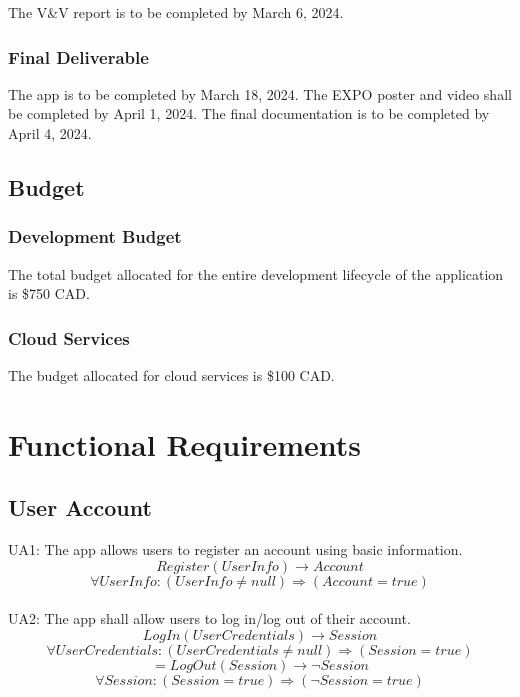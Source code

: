 \documentclass[12pt]{article}
\begin{document}
The V\&V report is to be completed by March 6, 2024.

\subsubsection{Final Deliverable}

The app is to be completed by March 18, 2024. The EXPO poster and video shall be completed by April 1, 2024. The final documentation is to be completed by April 4, 2024. 

\subsection{Budget}

\subsubsection{Development Budget}

The total budget allocated for the entire development lifecycle of the application is \$750 CAD.

\subsubsection{Cloud Services}

The budget allocated for cloud services is \$100 CAD.

\section{Functional Requirements}

\subsection{User Account}

\parindent UA1: The app allows users to register an account using basic information.
\[Register(UserInfo) \rightarrow Account \]
\[ \forall UserInfo: (UserInfo \neq null) \Rightarrow (Account = true) \]\\

UA2: The app shall allow users to log in/log out of their account.
\[LogIn(UserCredentials) \rightarrow Session \]
\[ \forall UserCredentials: (UserCredentials \neq null) \Rightarrow (Session = true) \]
\[=LogOut(Session) \rightarrow \neg Session \]
\[ \forall Session: (Session = true) \Rightarrow (\neg Session = true) \]\\
\end{document}

